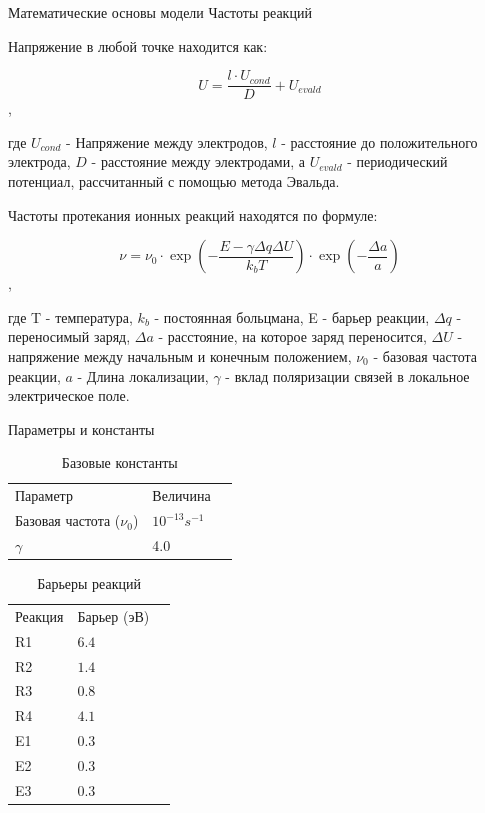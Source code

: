 \documentclass{beamer}%
\begin{document}

\begin{frame}{Математические основы модели} {Частоты реакций}

    \small

    Напряжение в любой точке находится как:

    \[U = \frac{l\cdot U_{cond}}{D}+U_{evald}\],

    где \(U_{cond}\) - Напряжение между электродов, \(l\) - расстояние до положительного электрода, \(D\) - расстояние между электродами, а \(U_{evald}\) - периодический потенциал, рассчитанный с помощью метода Эвальда.

    Частоты протекания ионных реакций находятся по формуле:

    \[\nu = \nu _0 \cdot
    \exp{(-\frac{E-\gamma \Delta q \Delta U}{k_bT})} \cdot
    \exp{(-\frac{\Delta a}{a})}
    \],

    где T - температура,
    \(k_b\) - постоянная больцмана,
    E - барьер реакции,
    \(\Delta q\) - переносимый заряд,
    \(\Delta a\) - расстояние, на которое заряд переносится,
    \(\Delta U\) - напряжение между начальным и конечным положением,
    \(\nu_0\)  - базовая частота реакции,
    \(a\) - Длина локализации,
    \(\gamma\) - вклад поляризации связей в локальное электрическое поле.
    

    
\end{frame}


\begin{frame}{Параметры и константы}
    \begin{table}
        \begin{tabular}{llc}
          Параметр & Величина\\ 
          Базовая частота (\(\nu _0\)) &
          \(10^{-13} s^{-1}\) \\
          \(\gamma\) & 4.0 \\
        \end{tabular}
        \caption{Базовые константы}
      \end{table}

      \begin{table}
        \begin{tabular}{llc}
          Реакция & Барьер (эВ) \\ 
          R1 &  \(6.4\) \\
          R2 &  \(1.4\) \\
          R3 &  \(0.8\) \\
          R4 &  \(4.1\) \\
          E1 &  \(0.3\) \\
          E2 &  \(0.3\) \\
          E3 &  \(0.3\) \\
        \end{tabular}
        \caption{Барьеры реакций}
      \end{table}


\end{frame}
\end{document}
